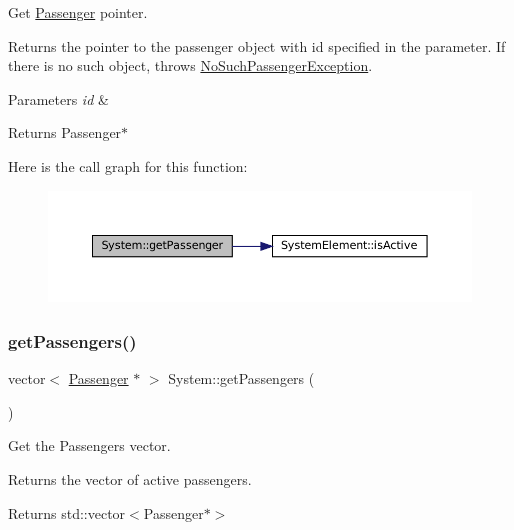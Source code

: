 Get \mbox{\hyperlink{classPassenger}{Passenger}} pointer. 

Returns the pointer to the passenger object with id specified in the parameter. If there is no such object, throws \mbox{\hyperlink{classNoSuchPassengerException}{No\+Such\+Passenger\+Exception}}.


\begin{DoxyParams}{Parameters}
{\em id} & \\
\hline
\end{DoxyParams}
\begin{DoxyReturn}{Returns}
Passenger$\ast$ 
\end{DoxyReturn}
Here is the call graph for this function\+:
\nopagebreak
\begin{figure}[H]
\begin{center}
\leavevmode
\includegraphics[width=350pt]{classSystem_a166d21a8b7c87bb6779420b77387fce6_cgraph}
\end{center}
\end{figure}
\mbox{\label{classSystem_a068044900b7db2474b6b97c9bed602e5}} 
\subsubsection{\texorpdfstring{get\+Passengers()}{getPassengers()}}
{\footnotesize\ttfamily vector$<$ \mbox{\hyperlink{classPassenger}{Passenger}} $\ast$ $>$ System\+::get\+Passengers (\begin{DoxyParamCaption}{ }\end{DoxyParamCaption})}



Get the Passengers vector. 

Returns the vector of active passengers.

\begin{DoxyReturn}{Returns}
std\+::vector$<$\+Passenger$\ast$$>$ 
\end{DoxyReturn}
\mbox{\label{classSystem_a2c7e714df1c7788f724cdfbd9eab3984}} 
